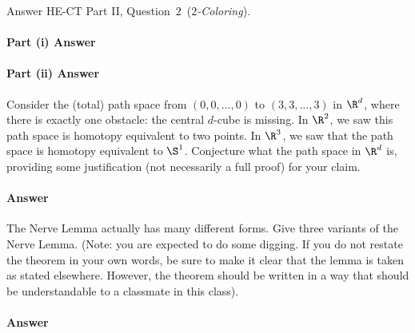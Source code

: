 \documentclass{article}
\begin{document}
Answer HE-CT Part II, Question~$2$~(\emph{$2$-Coloring}).

\paragraph{Part (i) Answer}

\paragraph{Part (ii) Answer}


Consider the (total) path space from $(0,0,\ldots,0)$ to $(3,3,\ldots,3)$ in $\R^d$,
where there is exactly one obstacle: the central $d$-cube is missing. In $\R^2$,
we saw this path space is homotopy equivalent to two points. In $\R^3$, we saw
that the path space is homotopy equivalent to $\S^1$.  Conjecture what the path
space in $\R^d$ is, providing some justification (not necessarily a full proof)
for your claim.

\paragraph{Answer}


The Nerve Lemma actually has many different forms.  Give three variants of the
Nerve Lemma.  (Note: you are expected to do some digging. If you do not restate
the theorem in your own words, be sure to make it clear that the lemma is taken
as stated elsewhere. However, the theorem should be written in a way that should
be understandable to a classmate in this class).

\paragraph{Answer}
\end{document}
